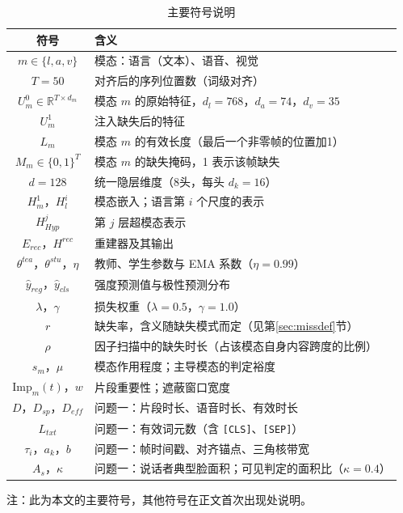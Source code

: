 \begin{table}[htbp]
\centering
\caption{主要符号说明}
\label{tab:symbols}
\begin{tabular}{cl}
\toprule
符号 & 含义 \\
\midrule
$m\in\{l,a,v\}$ & 模态：语言（文本）、语音、视觉 \\
$T=50$ & 对齐后的序列位置数（词级对齐） \\
$U_m^0\in\mathbb{R}^{T\times d_m}$ & 模态 $m$ 的原始特征，$d_l=768$，$d_a=74$，$d_v=35$ \\
$U_m^1$ & 注入缺失后的特征 \\
$L_m$ & 模态 $m$ 的有效长度（最后一个非零帧的位置加1） \\
$M_m\in\{0,1\}^T$ & 模态 $m$ 的缺失掩码，1 表示该帧缺失 \\
$d=128$ & 统一隐层维度（8头，每头 $d_k=16$） \\
$H_m^1$，$H_l^i$ & 模态嵌入；语言第 $i$ 个尺度的表示 \\
$H_{Hyp}^j$ & 第 $j$ 层超模态表示 \\
$E_{rec}$，$H^{rec}$ & 重建器及其输出 \\
$\theta^{tea}$，$\theta^{stu}$，$\eta$ & 教师、学生参数与 EMA 系数（$\eta=0.99$） \\
$\hat y_{reg}$，$\hat y_{cls}$ & 强度预测值与极性预测分布 \\
$\lambda$，$\gamma$ & 损失权重（$\lambda=0.5$，$\gamma=1.0$） \\
$r$ & 缺失率，含义随缺失模式而定（见第\ref{sec:missdef}节） \\
$\rho$ & 因子扫描中的缺失时长（占该模态自身内容跨度的比例） \\
$s_m$，$\mu$ & 模态作用程度；主导模态的判定裕度 \\
$\mathrm{Imp}_m(t)$，$w$ & 片段重要性；遮蔽窗口宽度 \\
\midrule
$D$，$D_{sp}$，$D_{eff}$ & 问题一：片段时长、语音时长、有效时长 \\
$L_{txt}$ & 问题一：有效词元数（含 \texttt{[CLS]}、\texttt{[SEP]}） \\
$\tau_i$，$a_k$，$b$ & 问题一：帧时间戳、对齐锚点、三角核带宽 \\
$A_s$，$\kappa$ & 问题一：说话者典型脸面积；可见判定的面积比（$\kappa=0.4$） \\
\bottomrule
\end{tabular}
\end{table}

注：此为本文的主要符号，其他符号在正文首次出现处说明。
